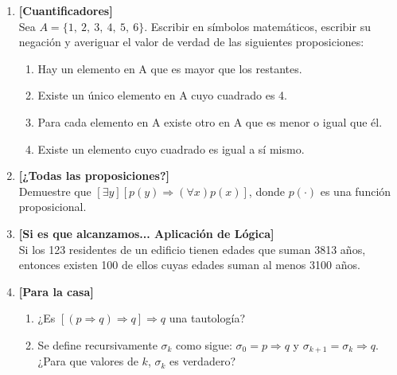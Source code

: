 \documentclass[letterpaper,11pt]{article}
\theoremstyle{plain}
\begin{document}
\begin{enumerate}[\bf P1.]
    \item \textbf{[Cuantificadores]} \\
    Sea $A=\{1,\ 2,\ 3,\ 4,\ 5,\ 6  \}$. Escribir en símbolos matemáticos, escribir su negación y averiguar el valor de verdad de las siguientes proposiciones:
        \begin{enumerate}
            \item Hay un elemento en A que es mayor que los restantes.
            \item Existe un único elemento en A  cuyo cuadrado es 4.
            \item Para cada elemento en A existe otro en A que es menor o igual que él.
            \item Existe un elemento cuyo cuadrado es igual a sí mismo.
        \end{enumerate} 
        
    \item \textbf{[¿Todas las proposiciones?]} \\
    Demuestre que $[\exists y] [p(y)\Rightarrow (\forall{x})p(x)]$, donde $p(\cdot)$ es una función proposicional.
    
    \item \textbf{[Si es que alcanzamos... Aplicación de Lógica]} \\Si los 123 residentes de un edificio tienen edades que suman 3813 años, entonces existen 100 de ellos cuyas edades suman al menos 3100 años.

    
    \item \textbf{[Para la casa]}
        \begin{enumerate}
            \item ¿Es $[(p\Rightarrow q) \Rightarrow q] \Rightarrow q$ una tautología?
            \item Se define recursivamente $\sigma_{k}$ como sigue: $\sigma_{0}=p\Rightarrow q$ y $\sigma_{k+1}=\sigma_{k}\Rightarrow q$. ¿Para que valores de $k$, $\sigma_{k}$ es verdadero?
        \end{enumerate}
        
\end{enumerate}
\end{document}
